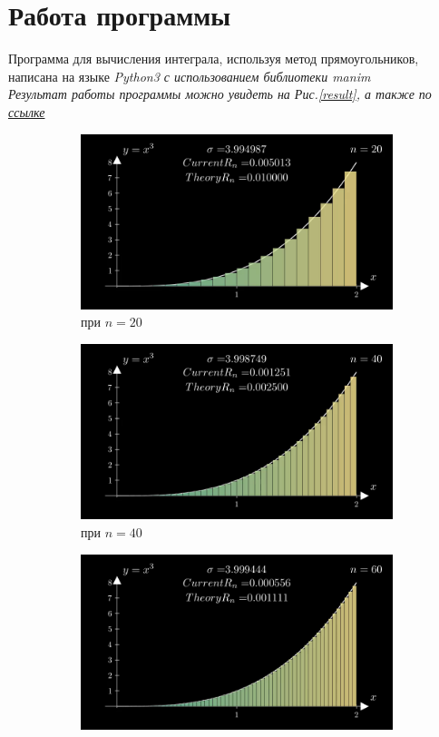 \documentclass[a4paper, 11pt]{article}
\begin{document}
	\section{Работа программы}
	Программа для вычисления интеграла, используя метод прямоугольников, написана на языке \itshape{Python3} с использованием библиотеки \itshape{manim}\\
	Результат работы программы можно увидеть на Рис.\ref{result}, а также по  \href{https://github.com/Egor-Magazenkov/Math_analysis_Lab_1}{ссылке}
	\begin{figure}
		\begin{center}
			\begin{subfigure}{0.45\linewidth}
				\includegraphics[width=\linewidth]{"./20.png"}
				\caption{при $n=20$}
			\end{subfigure}
			\begin{subfigure}{0.45\linewidth}
				\includegraphics[width=\linewidth]{"./40.png"}
				\caption{при $n=40$}
			\end{subfigure}
			\begin{subfigure}{0.45\linewidth}
				\includegraphics[width=\linewidth]{"./60.png"}

\end{subfigure}
\end{center}
\end{figure}
\end{document}
